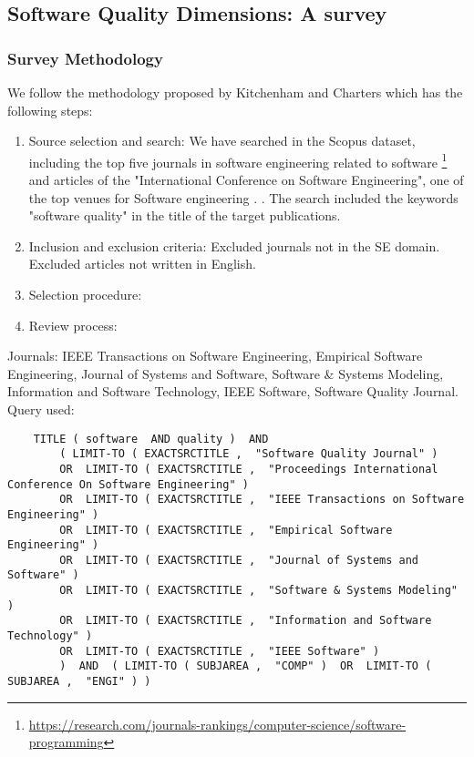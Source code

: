 \subsection{Software Quality Dimensions: A survey}


\subsubsection{Survey Methodology}
We follow the methodology proposed by Kitchenham and Charters \cite{kitchenham2007guidelines} which has the following steps:
\begin{enumerate}
    \item Source selection and search: We have searched in the Scopus dataset, including the top five journals in software engineering related to software \footnote{\url{https://research.com/journals-rankings/computer-science/software-programming}} and articles of the  "International Conference on Software Engineering", one of the top venues for Software engineering . . The search included the keywords "software quality" in the title of the target publications. 
    \item Inclusion and exclusion criteria: Excluded journals not in the SE domain. Excluded articles not written in English.
    \item Selection procedure: 
    \item Review process: 
\end{enumerate}

Journals: IEEE Transactions on Software Engineering, Empirical Software Engineering, Journal of Systems and Software, Software \& Systems Modeling,  Information and Software Technology, IEEE Software, Software Quality Journal. Query used:

\begin{verbatim}
    TITLE ( software  AND quality )  AND  
        ( LIMIT-TO ( EXACTSRCTITLE ,  "Software Quality Journal" )  
        OR  LIMIT-TO ( EXACTSRCTITLE ,  "Proceedings International Conference On Software Engineering" ) 
        OR  LIMIT-TO ( EXACTSRCTITLE ,  "IEEE Transactions on Software Engineering" )
        OR  LIMIT-TO ( EXACTSRCTITLE ,  "Empirical Software Engineering" ) 
        OR  LIMIT-TO ( EXACTSRCTITLE ,  "Journal of Systems and Software" ) 
        OR  LIMIT-TO ( EXACTSRCTITLE ,  "Software & Systems Modeling" ) 
        OR  LIMIT-TO ( EXACTSRCTITLE ,  "Information and Software Technology" )  
        OR  LIMIT-TO ( EXACTSRCTITLE ,  "IEEE Software" )   
        )  AND  ( LIMIT-TO ( SUBJAREA ,  "COMP" )  OR  LIMIT-TO ( SUBJAREA ,  "ENGI" ) )  
\end{verbatim}

